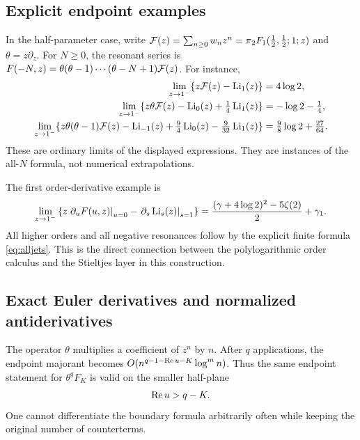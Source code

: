 \subsection{Explicit endpoint examples}
In the half-parameter case, write
$\mathcal F(z)=\sum_{n\ge0}w_nz^n=\pi{}_2F_1(\tfrac12,\tfrac12;1;z)$
and $\theta=z\partial_z$.  For $N\ge0$, the resonant series is
$F(-N,z)=\theta(\theta-1)\cdots(\theta-N+1)\mathcal F(z)$.
For instance,
\begin{align}
 \lim_{z\to1^-}\{z\mathcal F(z)-\operatorname{Li}_1(z)\}
 &=4\log2,\label{eq:z0}\\
 \lim_{z\to1^-}\{z\theta\mathcal F(z)-\operatorname{Li}_0(z)+\tfrac14\operatorname{Li}_1(z)\}
 &=-\log2-\tfrac14,\label{eq:z1}\\
 \lim_{z\to1^-}\{z\theta(\theta-1)\mathcal F(z)-\operatorname{Li}_{-1}(z)
       +\tfrac94\operatorname{Li}_0(z)-\tfrac9{32}\operatorname{Li}_1(z)\}
 &=\tfrac98\log2+\tfrac{27}{64}.\label{eq:z2}
\end{align}
These are ordinary limits of the displayed expressions.  They are
instances of the all-$N$ formula, not numerical extrapolations.

The first order-derivative example is
\begin{align}
 \lim_{z\to1^-}\left\{
 z\left.\partial_uF(u,z)\right|_{u=0}
 -\left.\partial_s\operatorname{Li}_s(z)\right|_{s=1}\right\}
 =\frac{(\gamma+4\log2)^2-5\zeta(2)}2+\gamma_1.
 \label{eq:zstieltjes}
\end{align}
All higher orders and all negative resonances follow by the explicit finite
formula \eqref{eq:alljets}.  This is the direct connection between the
polylogarithmic order calculus and the Stieltjes layer in this construction.

\subsection{Exact Euler derivatives and normalized antiderivatives}
The operator $\theta$ multiplies a coefficient of $z^n$ by $n$.
After $q$ applications, the endpoint majorant becomes
$O(n^{q-1-\operatorname{Re} u-K}\log^m n)$.  Thus the same endpoint statement for
$\theta^qF_K$ is valid on the smaller half-plane
\begin{equation}\label{eq:thetadomain}
 \operatorname{Re} u>q-K.
\end{equation}
One cannot differentiate the boundary formula arbitrarily often while
keeping the original number of counterterms.

